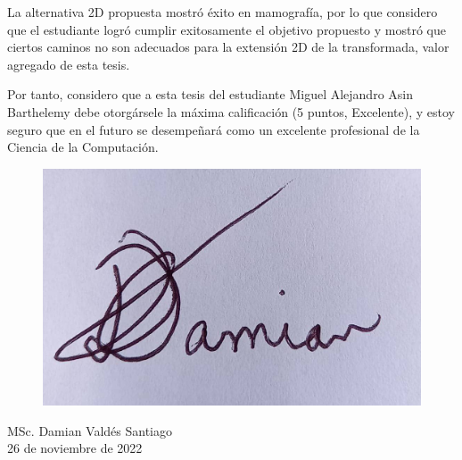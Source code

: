 \begin{opinion}
\par La alternativa 2D propuesta mostró éxito en mamografía, por lo que considero que el estudiante logró cumplir exitosamente el objetivo propuesto y mostró que ciertos caminos no son adecuados para la extensión 2D de la transformada, valor agregado de esta tesis.

\par Por tanto, considero que a esta tesis del estudiante Miguel Alejandro Asin Barthelemy debe otorgársele la máxima calificación (5 puntos, Excelente), y estoy seguro que en el futuro se desempeñará como un excelente profesional de la Ciencia de la Computación.

\begin{flushright}
\begin{figure}[h]
\flushright
\includegraphics[scale=.1]{Graphics/tutorfirma.jpg}
\end{figure}
MSc. Damian Valdés Santiago\\
26 de noviembre de 2022
\end{flushright}
\end{opinion}